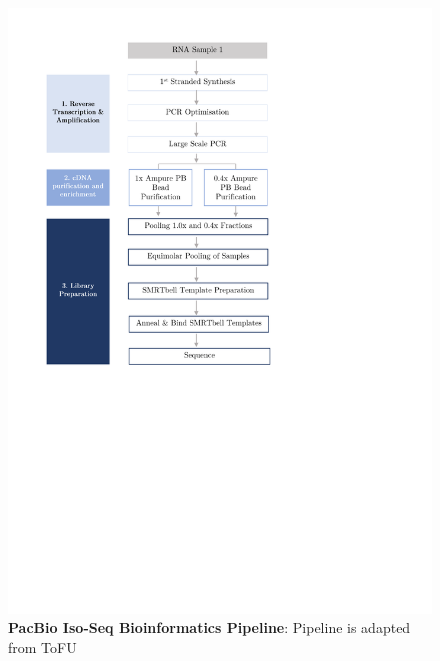 \begin{figure}[h!]
	\centering
	\vspace{20pt}
	\includegraphics[page=17,trim={2cm 28cm 2cm 5cm},clip,scale = 0.8]{Figures/ProjectDevelopment_Figures.pdf}
	\captionsetup{width=0.95\textwidth}
	\caption[PacBio Iso-Seq Bioinformatics Pipeline]%
	{\textbf{PacBio Iso-Seq Bioinformatics Pipeline}: Pipeline is adapted from ToFU  \cite{Gordon2015}}
	\label{fig:isoseq_bioinformatics_Pipeline}
\end{figure}


